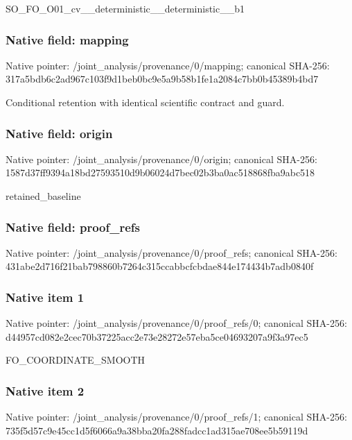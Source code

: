 \documentclass[10pt,a4paper]{article}
\begin{document}
\begingroup\raggedright\sloppy SO\_\allowbreak{}FO\_\allowbreak{}O01\_\allowbreak{}cv\_\allowbreak{}\_\allowbreak{}deterministic\_\allowbreak{}\_\allowbreak{}deterministic\_\allowbreak{}\_\allowbreak{}b1\par\endgroup

\subsubsection{Native field: mapping}
Native pointer: /joint\_\allowbreak{}analysis/provenance/0/mapping; canonical SHA-256: 317a5bdb6c2ad967c103f9d1beb0bc9e5a9b58b1fe1a2084c7bb0b45389b4bd7

\begingroup\raggedright\sloppy Conditional retention with identical scientific contract and guard.\par\endgroup

\subsubsection{Native field: origin}
Native pointer: /joint\_\allowbreak{}analysis/provenance/0/origin; canonical SHA-256: 1587d37ff9394a18bd27593510d9b06024d7bec02b3ba0ac518868fba9abc518

\begingroup\raggedright\sloppy retained\_\allowbreak{}baseline\par\endgroup

\subsubsection{Native field: proof\_\allowbreak{}refs}
Native pointer: /joint\_\allowbreak{}analysis/provenance/0/proof\_\allowbreak{}refs; canonical SHA-256: 431abe2d716f21bab798860b7264c315ccabbcfcbdae844e174434b7adb0840f

\subsubsection{Native item 1}
Native pointer: /joint\_\allowbreak{}analysis/provenance/0/proof\_\allowbreak{}refs/0; canonical SHA-256: d44957cd082e2cec70b37225acc2e73e28272e57eba5ce04693207a9f3a97ec5

\begingroup\raggedright\sloppy FO\_\allowbreak{}COORDINATE\_\allowbreak{}SMOOTH\par\endgroup

\subsubsection{Native item 2}
Native pointer: /joint\_\allowbreak{}analysis/provenance/0/proof\_\allowbreak{}refs/1; canonical SHA-256: 735f5d57c9e45cc1d5f6066a9a38bba20fa288fadcc1ad315ae708ee5b59119d
\end{document}
